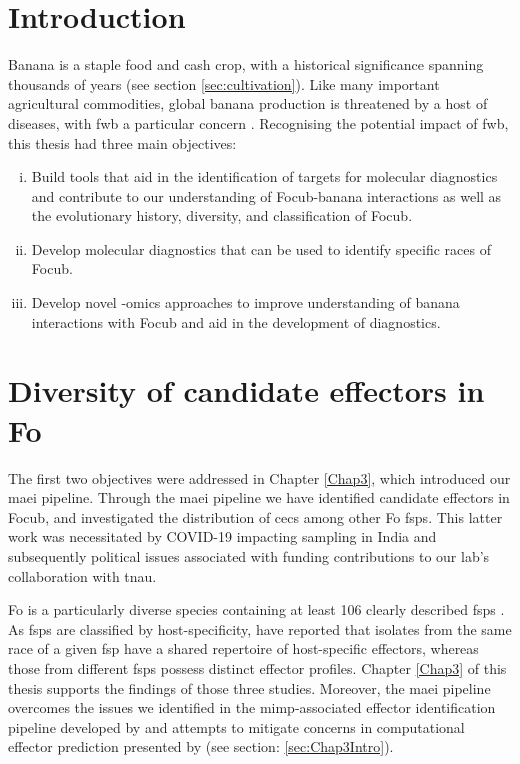 
\section{Introduction}

Banana is a staple food and cash crop, with a historical significance spanning thousands of years (see section \ref{sec:cultivation}). Like many important agricultural commodities, global banana production is threatened by a host of diseases, with \Acf{fwb} a particular concern \parencite{Ploetz2005}. Recognising the potential impact of \ac{fwb}, this thesis had three main objectives:

\begin{enumerate}[i)]
    \item Build tools that aid in the identification of targets for molecular diagnostics and contribute to our understanding of \acf{Focub}-banana interactions as well as the evolutionary history, diversity, and classification of \ac{Focub}.
    \item Develop molecular diagnostics that can be used to identify specific races of \ac{Focub}. 
    \item Develop novel -omics approaches to improve understanding of banana interactions with \ac{Focub} and aid in the development of diagnostics.
\end{enumerate}

\section{Diversity of candidate effectors in \acl{Fo}}

The first two objectives were addressed in Chapter \ref{Chap3}, which introduced our \acf{maei} pipeline. Through the \ac{maei} pipeline we have identified candidate effectors in \ac{Focub}, and investigated the distribution of \acfp{cec} among other \acf{Fo} \acfp{fsp}. This latter work was necessitated by COVID-19 impacting sampling in India and subsequently political issues associated with funding contributions to our lab's collaboration with \acf{tnau}. 

\ac{Fo} is a particularly diverse species containing at least 106 clearly described \acp{fsp} \parencite{Edel-Hermann2019}. As \acp{fsp} are classified by host-specificity, \textcite{Dam2016,Dam2017,FoEC2} have reported that isolates from the same race of a given \ac{fsp} have a shared repertoire of host-specific effectors, whereas those from different \acp{fsp} possess distinct effector profiles. Chapter \ref{Chap3} of this thesis supports the findings of those three studies. Moreover, the \ac{maei} pipeline overcomes the issues we identified in the \ac{mimp}-associated effector identification pipeline developed by \textcite{Dam2016} and attempts to mitigate concerns in computational effector prediction presented by \textcite{Sperschneider2015, LoPresti2015, Todd2022} (see section: \ref{sec:Chap3Intro}). 

